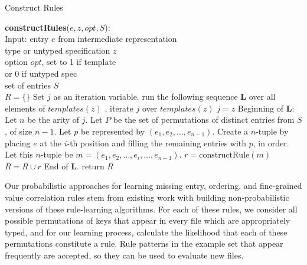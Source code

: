 \begin{algorithm}[t]
\caption{Construct Rules}
\label{alg:crules}
\begin{footnotesize}
  \begin{algorithmic}[1]
 \State \textbf{constructRules}($e, z, opt, S$):\\
    Input: entry $e$ from intermediate representation\\
     \qquad \enspace \enspace type or untyped specification $z$\\
     \qquad \enspace \enspace option $opt$, set to 1 if template\\
     \qquad \qquad \enspace \enspace \enspace \enspace \qquad or 0 if untyped spec\\
     \qquad \enspace \enspace set of entries $S$\\
     \State $R = \{\}$
     \State Set $j$ as an iteration variable.
        \State run the following sequence \textbf{L} over all elements of $templates(z)$ 
        \State \ie, iterate $j$ over $templates(z)$
        \State $j = z$
     \EndIf
     \State Beginning of \textbf{L}: 
     \State Let $n$ be the arity of $j$.
      \State Let $P$ be the set of permutations of distinct entries from $S$, of size $n-1$.
        \State Let $p$ be represented by $(e_1, e_2, \ldots, e_{n-1})$.
         \State Create a $n$-tuple by placing $e$ at the $i$-th position and filling the remaining entries with $p$, in order. Let this $n$-tuple be $m = (e_1, e_2, \ldots, e_i, \ldots, e_{n-1})$.
         \State $r = \textrm{constructRule}(m)$
                $R = R \cup r$
         \EndIf
        \EndFor
     \EndFor
     \State End of \textbf{L}. 
     \State return $R$
  \end{algorithmic}
\end{footnotesize}
\end{algorithm}

Our probabilistic approaches for learning missing entry, 
ordering, and fine-grained value correlation rules stem 
from existing work with building 
non-probabilistic versions of these rule-learning algorithms. 
For each of these rules, 
we consider all possible permutations of keys that appear in every 
file which are appropriately typed, and for our learning process, calculate the likelihood that each of 
these permutations constitute a rule. 
Rule patterns in the example set that appear frequently are accepted,
so they can be used to evaluate new files.

